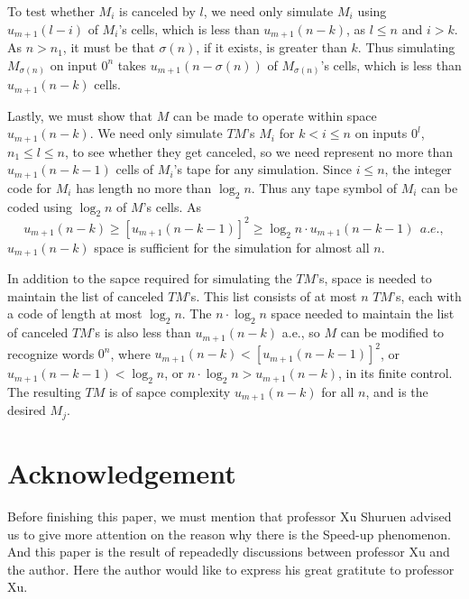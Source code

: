 To test whether $M_i$ is canceled by $l$, we need only simulate 
$M_i$ using $u_{m+1}(l-i)$ of $M_i$'s cells, which is less than 
$u_{m+1}(n-k)$, as $l\le n$ and $i>k$. As $n>n_1$, it must be 
that $\sigma(n)$, if it exists, is greater than $k$. Thus 
simulating $M_{\sigma(n)}$ on input $0^n$ takes $u_{m+1}(n-
\sigma(n))$ of $M_{\sigma(n)}$'s cells, which is less than 
$u_{m+1}(n-k)$ cells.

Lastly, we must show that $M$ can be made to operate within space 
$u_{m+1}(n-k)$. We need only simulate $TM$'s $M_i$ for $k<i\le n$ 
on inputs $0^l$, $n_1\le l\le n$, to see whether they get
canceled, so we need represent no more than $u_{m+1}(n-k-1)$ 
cells of $M_i$'s tape for any simulation. Since $i\le n$, the 
integer code for $M_i$ has length no more than $\log_2 n$. Thus
any tape symbol of $M_i$ can be coded using $\log_2 n$ of $M$'s
cells. As
$$u_{m+1}(n-k)\ge [u_{m+1}(n-k-1)]^2\ge\log_2 n\cdot u_{m+1}(n-k-
1)\ \ a.e.,$$
$u_{m+1}(n-k)$ space is sufficient for the simulation for almost 
all $n$.

In addition to the sapce required for simulating the $TM$'s, 
space is needed to maintain the list of canceled $TM$'s. This 
list consists of at most $n$ $TM$'s, each with a code of length 
at most $\log_2 n$. The $n\cdot\log_2 n$ space needed to maintain
the list of canceled $TM$'s is also less than $u_{m+1}(n-k)$ 
a.e., so $M$ can be modified to recognize words $0^n$, where
$u_{m+1}(n-k)<[u_{m+1}(n-k-1)]^2$, or $u_{m+1}(n-k-1)<\log_2 n$, 
or $n\cdot\log_2 n>u_{m+1}(n-k)$, in its finite control. The 
resulting $TM$ is of sapce complexity $u_{m+1}(n-k)$ for all $n$, 
and is the desired $M_j$.

\section{Acknowledgement}

Before finishing this paper, we must 
mention that professor Xu 
Shuruen advised us to give more attention on 
the reason why there 
is the Speed-up phenomenon. And this paper is the result of
repeadedly discussions between professor Xu and the author. Here 
the author would like to express his great 
gratitute to professor Xu.


